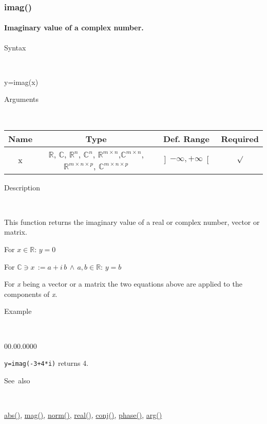 \newpage
\subsubsection*{\hypertarget{imag}{}{\Large imag()}}


\paragraph{\label{par:Imag}Imaginary value of a complex number.}

\begin{description}
\item [Syntax]~
\end{description}
y=imag(x)

\begin{description}
\item [Arguments]~
\end{description}
\begin{tabular}{|c|c|c|c|}
\hline 
Name&
Type&
Def. Range&
Required\tabularnewline
\hline
\hline 
x&
$\mathbb{R}$, $\mathbb{C}$, $\mathbb{R}^{n}$, $\mathbb{C}^{n}$,
$\mathbb{\mathbb{R}}^{m\times n}$,$\mathbb{\mathbb{C}}^{m\times n}$,
$\mathbb{\mathbb{R}}^{m\times n\times p}$, $\mathbb{\mathbb{C}}^{m\times n\times p}$ &
$\left]-\infty,+\infty\right[$&
$\surd$\tabularnewline
\hline
\end{tabular}

\begin{description}
\item [Description]~
\end{description}
This function returns the imaginary value of a real or complex number,
vector or matrix.

\medskip{}
For $x\in\mathbb{R}$: $y=0$
\medskip{}

For $\mathbb{\mathbb{C}}\ni x\,:=a+i\, b\,\wedge\, a,b\in\mathbb{R}$:
$y=b$
\medskip{}

For \textit{x} being a vector or a matrix the two equations above
are applied to the components of \textit{x}.

\begin{description}
\item [Example]~
\end{description}
\begin{lyxlist}{00.00.0000}
\item [\texttt{y=imag(-3+4{*}i)}]returns 4.
\end{lyxlist}
\begin{description}
\item [See~also]~
\end{description}
\textcolor{blue}{\hyperlink{abs}{abs()}}, \textcolor{blue}{\hyperlink{mag}{mag()}},
\textcolor{blue}{\hyperlink{norm}{norm()}}, \textcolor{blue}{\hyperlink{real}{real()}},
\textcolor{blue}{\hyperlink{conj}{conj()}}, \textcolor{blue}{\hyperlink{phase}{phase()}},
\textcolor{blue}{\hyperlink{arg}{arg()}}


